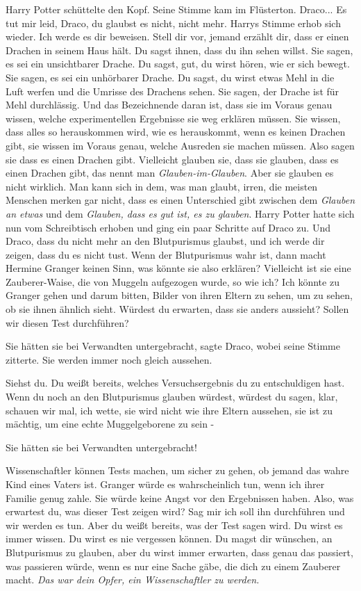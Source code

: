Harry Potter schüttelte den Kopf. Seine Stimme kam im Flüsterton. \glqq{}Draco...
Es tut mir leid, Draco, du glaubst es nicht, nicht mehr.\grqq{} Harrys Stimme
erhob sich wieder. \glqq{}Ich werde es dir beweisen. Stell dir vor, jemand
erzählt dir, dass er einen Drachen in seinem Haus hält. Du sagst ihnen, dass du
ihn sehen willst. Sie sagen, es sei ein unsichtbarer Drache. Du sagst, gut, du
wirst hören, wie er sich bewegt. Sie sagen, es sei ein unhörbarer Drache. Du
sagst, du wirst etwas Mehl in die Luft werfen und die Umrisse des Drachens
sehen. Sie sagen, der Drache ist für Mehl durchlässig. Und das Bezeichnende
daran ist, dass sie im Voraus genau wissen, welche experimentellen Ergebnisse
sie weg erklären müssen. Sie wissen, dass alles so herauskommen wird, wie es
herauskommt, wenn es keinen Drachen gibt, sie wissen im Voraus genau, welche
Ausreden sie machen müssen. Also sagen sie dass es einen Drachen gibt.
Vielleicht glauben sie, dass sie glauben, dass es einen Drachen gibt, das nennt
man \emph{Glauben-im-Glauben}. Aber sie glauben es nicht wirklich. Man kann sich
in dem, was man glaubt, irren, die meisten Menschen merken gar nicht, dass es
einen Unterschied gibt zwischen dem \emph{Glauben an etwas} und dem
\emph{Glauben, dass es gut ist, es zu glauben}.\grqq{} Harry Potter hatte sich
nun vom Schreibtisch erhoben und ging ein paar Schritte auf Draco zu. \glqq{}Und
Draco, dass du nicht mehr an den Blutpurismus glaubst, und ich werde dir zeigen,
dass du es nicht tust. Wenn der Blutpurismus wahr ist, dann macht Hermine
Granger keinen Sinn, was könnte sie also erklären? Vielleicht ist sie eine
Zauberer-Waise, die von Muggeln aufgezogen wurde, so wie ich? Ich könnte zu
Granger gehen und darum bitten, Bilder von ihren Eltern zu sehen, um zu sehen,
ob sie ihnen ähnlich sieht. Würdest du erwarten, dass sie anders aussieht?
Sollen wir diesen Test durchführen?\grqq{}

\glqq{}Sie hätten sie bei Verwandten untergebracht\grqq{}, sagte Draco, wobei
seine Stimme zitterte. \glqq{}Sie werden immer noch gleich aussehen.\grqq{}

\glqq{}Siehst du. Du weißt bereits, welches Versuchsergebnis du zu entschuldigen
hast. Wenn du noch an den Blutpurismus glauben würdest, würdest du sagen, klar,
schauen wir mal, ich wette, sie wird nicht wie ihre Eltern aussehen, sie ist zu
mächtig, um eine echte Muggelgeborene zu sein -\grqq{}

\glqq{}Sie hätten sie bei Verwandten untergebracht!\grqq{}

\glqq{}Wissenschaftler können Tests machen, um sicher zu gehen, ob jemand das
wahre Kind eines Vaters ist. Granger würde es wahrscheinlich tun, wenn ich ihrer
Familie genug zahle. Sie würde keine Angst vor den Ergebnissen haben. Also, was
erwartest du, was dieser Test zeigen wird? Sag mir ich soll ihn durchführen und
wir werden es tun. Aber du weißt bereits, was der Test sagen wird. Du wirst es
immer wissen. Du wirst es nie vergessen können. Du magst dir wünschen, an
Blutpurismus zu glauben, aber du wirst immer erwarten, dass genau das passiert,
was passieren würde, wenn es nur eine Sache gäbe, die dich zu einem Zauberer
macht. \emph{Das war dein Opfer, ein Wissenschaftler zu werden.}\grqq{}

